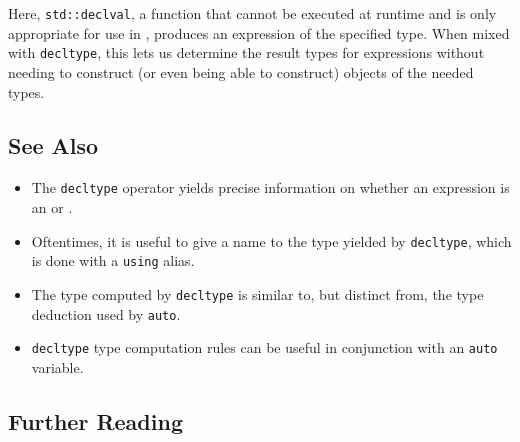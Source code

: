 Here, \lstinline!std::declval!, a function that cannot be executed at runtime and is only appropriate for use in , produces an expression of the specified type.  When mixed with \lstinline!decltype!, this lets us determine the result types for expressions without needing to construct (or even being able to construct) objects of the needed types.

\subsection[See Also]{See Also}\label{see-also}

\begin{itemize}
\item{%
The \lstinline!decltype! operator yields precise information on whether an expression is an  or .}
\item{%
Oftentimes, it is useful to give a name to the type yielded by \lstinline!decltype!, which is done with a \lstinline!using! alias.}
\item{%
The type computed by \lstinline!decltype! is similar to, but distinct from, the type deduction used by \lstinline!auto!.}
\item{%
\lstinline!decltype! type computation rules can be useful in conjunction with an \lstinline!auto! variable.}
\end{itemize}

\subsection[Further Reading]{Further Reading}\label{further-reading}




